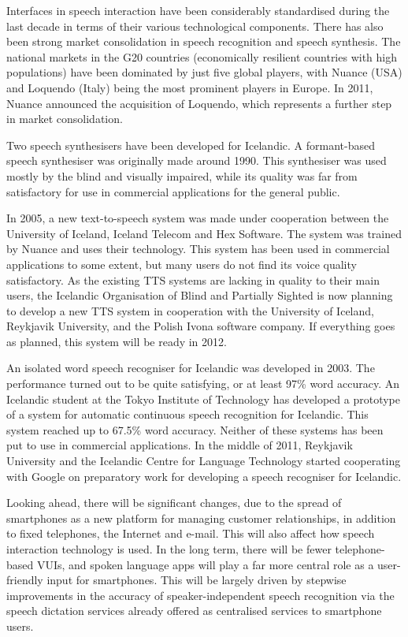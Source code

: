 \documentclass{../../metanetpaper}
\begin{document}
\begin{multicols}{2}
Interfaces in speech interaction have been considerably standardised during the last decade in terms of their various technological components. There has also been strong market consolidation in speech recognition and speech synthesis. The national markets in the G20 countries (economically resilient countries with high populations) have been dominated by just five global players, with Nuance (USA) and Loquendo (Italy) being the most prominent players in Europe. In 2011, Nuance announced the acquisition of Loquendo, which represents a further step in market consolidation.

Two speech synthesisers have been developed for Icelandic. A formant-based speech synthesiser was originally made around 1990. This synthesiser was used mostly by the blind and visually impaired, while its quality was far from satisfactory for use in commercial applications for the general public.

In 2005, a new text-to-speech system was made under cooperation between the University of Iceland, Iceland Telecom and Hex Software. The system was trained by Nuance and uses their technology. This system has been used in commercial applications to some extent, but many users do not find its voice quality satisfactory. As the existing TTS systems are lacking in quality to their main users, the Icelandic Organisation of Blind and Partially Sighted is now planning to develop a new TTS system in cooperation with the University of Iceland, Reykjavik University, and the Polish Ivona software company. If everything goes as planned, this system will be ready in 2012\cite{tal1}. 

An isolated word speech recogniser for Icelandic was developed in 2003. The performance turned out to be quite satisfying, or at least 97\% word accuracy. An Icelandic student at the Tokyo Institute of Technology has developed a prototype of a system for automatic continuous speech recognition for Icelandic. This system reached up to 67.5\% word accuracy\cite{hind1}. Neither of these systems has been put to use in commercial applications. In the middle of 2011, Reykjavik University and the Icelandic Centre for Language Technology started cooperating with Google on preparatory work for developing a speech recogniser for Icelandic\cite{alm1}.

Looking ahead, there will be significant changes, due to the spread of smartphones as a new platform for managing customer relationships, in addition to fixed telephones, the Internet and e-mail. This will also affect how speech interaction technology is used. In the long term, there will be fewer telephone-based VUIs, and spoken language apps will play a far more central role as a user-friendly input for smartphones. This will be largely driven by stepwise improvements in the accuracy of speaker-independent speech recognition via the speech dictation services already offered as centralised services to smartphone users.


\end{multicols}
\end{document}
